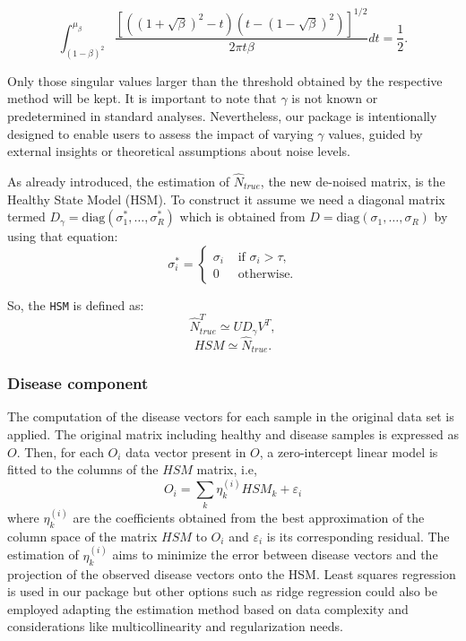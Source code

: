 \[\int_{(1-\beta)^2}^{\mu_{\beta}}\frac{\left[ \left((1 + \sqrt{\beta})^2 -t \right) \left( t - (1 - \sqrt{\beta})^2\right)\right]^{1/2}}{2\pi t \beta}dt = \frac{1}{2}.\]

Only those singular values larger than the threshold obtained by the respective method will be kept. It is important to note that \(\gamma\) is not known or predetermined in standard analyses. Nevertheless, our package is intentionally designed to enable users to assess the impact of varying \(\gamma\) values, guided by external insights or theoretical assumptions about noise levels.

As already introduced, the estimation of \(\hat{N}_{true}\), the new de-noised matrix, is the Healthy State Model (HSM). To construct it assume we need a diagonal matrix termed \(D_{\gamma} = \mathrm{diag}(\sigma_1^*,\ldots,\sigma_R^*)\) which is obtained from \(D = \mathrm{diag}(\sigma_1,\ldots,\sigma_R)\) by using that equation:
\[
  \sigma_i^* = \left\{
    \begin{array}{cc}
    \sigma_i & \text{ if } \sigma_i > \tau, \\ 
    0 & \text{ otherwise.}
    \end{array}
    \right.
\]

So, the \texttt{HSM} is defined as:
\[\hat{N}_{true}^T \simeq U D_{\gamma}V^T,\]
\[\textit{HSM} \simeq \hat{N}_{true}.\]

\hypertarget{section2.1.3}{%
\subsubsection{Disease component}\label{section2.1.3}}

The computation of the disease vectors for each sample in the original data set is applied. The original matrix including healthy and disease samples is expressed as \(O\). Then, for each \(O_{i}\) data vector present in \(O\), a zero-intercept linear model is fitted to the columns of the \(HSM\) matrix, i.e,
\[
O_i = \sum_k \eta_k^{(i)} HSM_k + \varepsilon_i
\]
where \(\eta_k^{(i)}\) are the coefficients obtained from the best approximation of the column space of the matrix \(HSM\) to \(O_i\) and \(\varepsilon_i\) is its corresponding residual. The estimation of \(\eta_k^{(i)}\) aims to minimize the error between disease vectors and the projection of the observed disease vectors onto the HSM. Least squares regression is used in our package but other options such as ridge regression could also be employed adapting the estimation method based on data complexity and considerations like multicollinearity and regularization needs.

